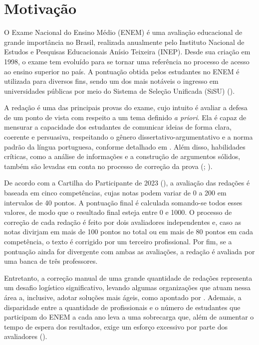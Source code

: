 \section{Motivação}

O Exame Nacional do Ensino Médio (ENEM) é uma avaliação educacional de grande importância no Brasil, realizada anualmente pelo Instituto Nacional de Estudos e Pesquisas Educacionais Anísio Teixeira (INEP). Desde sua criação em 1998, o exame tem evoluído para se tornar uma referência no processo de acesso ao ensino superior no país. A pontuação obtida pelos estudantes no ENEM é utilizada para diversos fins, sendo um dos mais notáveis o ingresso em universidades públicas por meio do Sistema de Seleção Unificada (SiSU) (\cite{oliveira-2016-enem}).

A redação é uma das principais provas do exame, cujo intuito é avaliar a defesa de um ponto de vista com respeito a um tema definido \textit{a priori}. Ela é capaz de mensurar a capacidade dos estudantes de comunicar ideias de forma clara, coerente e persuasiva, respeitando o gênero dissertativo-argumentativo e a norma padrão da língua portuguesa, conforme detalhado em \citet{cartilha-redacao}. Além disso, habilidades críticas, como a análise de informações e a construção de argumentos sólidos, também são levadas em conta no processo de correção da prova (\cite{enem-compIII}; \cite{enem-compIV}).

De acordo com a Cartilha do Participante de 2023 (\cite{cartilha-redacao}), a avaliação das redações é baseada em cinco competências, cujas notas podem variar de 0 a 200 em intervalos de 40 pontos. A pontuação final é calculada somando-se todos esses valores, de modo que o resultado final esteja entre 0 e 1000. O processo de correção de cada redação é feito por dois avaliadores independentes e, caso as notas divirjam em mais de 100 pontos no total ou em mais de 80 pontos em cada competência, o texto é corrigido por um terceiro profissional. Por fim, se a pontuação ainda for divergente com ambas as avaliações, a redação é avaliada por uma banca de três professores.

Entretanto, a correção manual de uma grande quantidade de redações representa um desafio logístico significativo, levando algumas organizações que atuam nessa área a, inclusive, adotar soluções mais ágeis, como apontado por \cite{taghipour-ng-2016-neural}. Ademais, a disparidade entre a quantidade de profissionais e o número de estudantes que participam do ENEM a cada ano leva a uma sobrecarga que, além de aumentar o tempo de espera dos resultados, exige um esforço excessivo por parte dos avaliadores (\cite{lesme-20-redacoes-noticia}).


